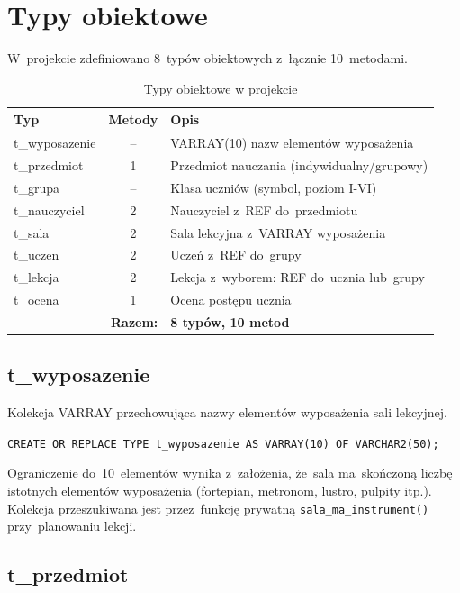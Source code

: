 \documentclass[12pt,a4paper]{article}
\begin{document}
\newpage
\section{Typy obiektowe}

W~projekcie zdefiniowano 8~typów obiektowych z~łącznie 10~metodami.

\begin{table}[h]
\centering
\begin{tabular}{|l|c|p{7cm}|}
\hline
\textbf{Typ} & \textbf{Metody} & \textbf{Opis} \\
\hline
t\_wyposazenie & -- & VARRAY(10) nazw elementów wyposażenia \\
t\_przedmiot & 1 & Przedmiot nauczania (indywidualny/grupowy) \\
t\_grupa & -- & Klasa uczniów (symbol, poziom I-VI) \\
t\_nauczyciel & 2 & Nauczyciel z~REF do~przedmiotu \\
t\_sala & 2 & Sala lekcyjna z~VARRAY wyposażenia \\
t\_uczen & 2 & Uczeń z~REF do~grupy \\
t\_lekcja & 2 & Lekcja z~wyborem: REF do~ucznia lub~grupy \\
t\_ocena & 1 & Ocena postępu ucznia \\
\hline
\multicolumn{2}{|r|}{\textbf{Razem:}} & \textbf{8 typów, 10 metod} \\
\hline
\end{tabular}
\caption{Typy obiektowe w projekcie}
\end{table}

\subsection{t\_wyposazenie}

Kolekcja VARRAY przechowująca nazwy elementów wyposażenia sali lekcyjnej.

\texttt{CREATE OR REPLACE TYPE t\_wyposazenie AS VARRAY(10) OF VARCHAR2(50);}

Ograniczenie do~10~elementów wynika z~założenia, że~sala ma~skończoną liczbę istotnych elementów wyposażenia (fortepian, metronom, lustro, pulpity itp.). Kolekcja przeszukiwana jest przez~funkcję prywatną \texttt{sala\_ma\_instrument()} przy~planowaniu lekcji.

\subsection{t\_przedmiot}
\end{document}
